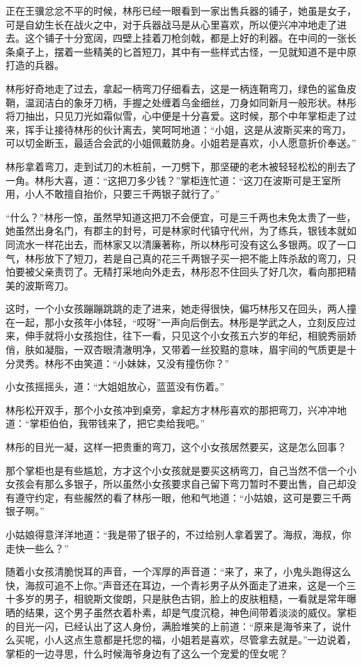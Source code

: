 正在王骥忿忿不平的时候，林彤已经一眼看到一家出售兵器的铺子，她虽是女子，可是自幼生长在战火之中，对于兵器战马是从心里喜欢，所以便兴冲冲地走了进去。这个铺子十分宽阔，四壁上挂着刀枪剑戟，都是上好的利器。在中间的一张长条桌子上，摆着一些精美的匕首短刀，其中有一些样式古怪，一见就知道不是中原打造的兵器。

林彤好奇地走了过去，拿起一柄弯刀仔细看去，这是一柄连鞘弯刀，绿色的鲨鱼皮鞘，温润洁白的象牙刀柄，手握之处缠着乌金细丝，刀身如同新月一般形状。林彤将刀抽出，只见刀光如霜似雪，心中便是十分喜爱。这时候，那个中年掌柜走了过来，挥手让接待林彤的伙计离去，笑呵呵地道：“小姐，这是从波斯买来的弯刀，可以切金断玉，最适合会武的小姐佩戴防身。小姐若是喜欢，小人愿意折价奉送。”

林彤拿着弯刀，走到试刀的木桩前，一刀劈下，那坚硬的老木被轻轻松松的削去了一角。林彤大喜，道：“这把刀多少钱？”掌柜连忙道：“这刀在波斯可是王室所用，小人不敢擅自抬价，只要三千两银子就行了。”

“什么？”林彤一惊，虽然早知道这把刀不会便宜，可是三千两也未免太贵了一些，她虽然出身名门，有郡主的封号，可是林家时代镇守代州，为了练兵，银钱本就如同流水一样花出去，而林家又以清廉著称，所以林彤可没有这么多银两。叹了一口气，林彤放下了短刀，若是自己真的花三千两银子买一把不能上阵杀敌的弯刀，只怕要被父亲责罚了。无精打采地向外走去，林彤忍不住回头了好几次，看向那把精美的波斯弯刀。

这时，一个小女孩蹦蹦跳跳的走了进来，她走得很快，偏巧林彤又在回头，两人撞在一起，那小女孩年小体轻，“哎呀”一声向后倒去。林彤是学武之人，立刻反应过来，伸手就将小女孩抱住，往下一看，只见这个小女孩五六岁的年纪，相貌秀丽娇俏，肤如凝脂，一双杏眼清澈明净，又带着一丝狡黠的意味，眉宇间的气质更是十分灵秀。林彤不由笑道：“小妹妹，又没有撞伤你？”

小女孩摇摇头，道：“大姐姐放心，蓝蓝没有伤着。”

林彤松开双手，那个小女孩冲到桌旁，拿起方才林彤喜欢的那把弯刀，兴冲冲地道：“掌柜伯伯，我带钱来了，把它卖给我吧。”

林彤的目光一凝，这样一把贵重的弯刀，这个小女孩居然要买，这是怎么回事？

那个掌柜也是有些尴尬，方才这个小女孩就是要买这柄弯刀，自己当然不信一个小女孩会有那么多银子，所以虽然小女孩要求自己留下弯刀暂时不要出售，自己却没有遵守约定，有些赧然的看了林彤一眼，他和气地道：“小姑娘，这可是要三千两银子啊。”

小姑娘得意洋洋地道：“我是带了银子的，不过给别人拿着罢了。海叔，海叔，你走快一些么？”

随着小女孩清脆悦耳的声音，一个浑厚的声音道：“来了，来了，小鬼头跑得这么快，海叔可追不上你。”声音还在耳边，一个青衫男子从外面走了进来，这是一个三十多岁的男子，相貌斯文俊朗，只是肤色古铜，脸上的皮肤粗糙，一看就是常年曝晒的结果，这个男子虽然衣着朴素，却是气度沉稳，神色间带着淡淡的威仪。掌柜的目光一闪，已经认出了这人身份，满脸堆笑的上前道：“原来是海爷来了，说什么买呢，小人这点生意都是托您的福，小姐若是喜欢，尽管拿去就是。”一边说着，掌柜的一边寻思，什么时候海爷身边有了这么一个宠爱的侄女呢？

